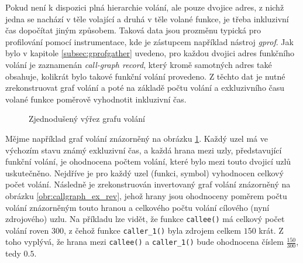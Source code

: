 \documentclass[czech,BP]{thesiskiv}
\begin{document}
Pokud není k dispozici plná hierarchie volání, ale pouze dvojice adres, z nichž jedna se nachází v těle volající a druhá v těle volané funkce, je třeba inkluzivní čas dopočítat jiným způsobem. Taková data jsou prozměnu typická pro profilování pomocí instrumentace, kde je zástupcem například nástroj \emph{gprof}. Jak bylo v kapitole \ref{subsec:gprofgather} uvedeno, pro každou dvojici adres funkčního volání je zaznamenán \emph{call-graph record}, který kromě samotných adres také obsahuje, kolikrát bylo takové funkční volání provedeno. Z těchto dat je nutné zrekonstruovat graf volání a poté na základě počtu volání a exkluzivního času volané funkce poměrově vyhodnotit inkluzivní čas.

\begin{figure}[htp] 
\caption{Zjednodušený výřez grafu volání}\label{obr:callgraph_ex}
\end{figure}

Mějme například graf volání znázorněný na obrázku \ref{obr:callgraph_ex}. Každý uzel má ve výchozím stavu známý exkluzivní čas, a každá hrana mezi uzly, představující funkční volání, je ohodnocena počtem volání, které bylo mezi touto dvojicí uzlů uskutečněno. Nejdříve je pro každý uzel (funkci, symbol) vyhodnocen celkový počet volání. Následně je zrekonstruován invertovaný graf volání znázorněný na obrázku \ref{obr:callgraph_ex_rev}, jehož hrany jsou ohodnoceny poměrem počtu volání znázorněným touto hranou a celkového počtu volání cílového (nyní zdrojového) uzlu. Na příkladu lze vidět, že funkce \texttt{callee()} má celkový počet volání roven $300$, z čehož funkce \texttt{caller\_1()} byla zdrojem celkem $150$ krát. Z toho vyplývá, že hrana mezi \texttt{callee()} a \texttt{caller\_1()} bude ohodnocena číslem $\frac{150}{300}$, tedy $0.5$.
\end{document}
